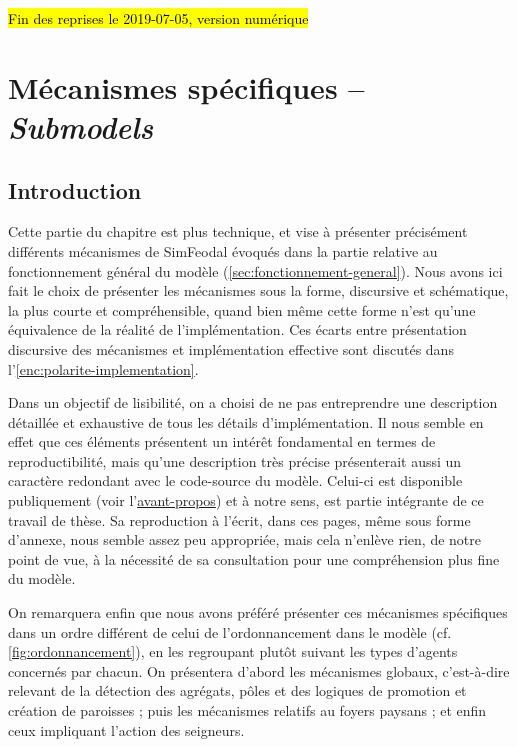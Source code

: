\begin{center}	
	\hl{Fin des reprises le 2019-07-05, version numérique}
\end{center}

\let\orisectionmark\sectionmark
\renewcommand\sectionmark[1]{}%
\section[Mécanismes spécifiques -- \textit{Submodels}]{Mécanismes spécifiques -- \large{\textit{Submodels}}\label{sec:meca-specifiques}}
\orisectionmark{Mécanismes spécifiques}
\let\sectionmark\orisectionmark


\subsection{Introduction}

Cette partie du chapitre est plus technique, et vise à présenter précisément différents mécanismes de SimFeodal évoqués dans la partie relative au fonctionnement général du modèle (\cref{sec:fonctionnement-general}).
Nous avons ici fait le choix de présenter les mécanismes sous la forme, discursive et schématique, la plus courte et compréhensible, quand bien même cette forme n'est qu'une \og équivalence\fg{} de la réalité de l'implémentation.
Ces écarts entre présentation discursive des mécanismes et implémentation effective sont discutés dans l'\cref{enc:polarite-implementation}.

Dans un objectif de lisibilité, on a choisi de ne pas entreprendre une description détaillée et exhaustive de tous les détails d'implémentation.
Il nous semble en effet que ces éléments présentent un intérêt fondamental en termes de reproductibilité, mais qu'une description très précise présenterait aussi un caractère redondant avec le code-source du modèle.
Celui-ci est disponible publiquement (voir l'\hyperlink{avant-propos}{avant-propos}) et à notre sens, est partie intégrante de ce travail de thèse.
Sa reproduction à l'écrit, dans ces pages, même sous forme d'annexe, nous semble assez peu appropriée, mais cela n'enlève rien, de notre point de vue, à la nécessité de sa consultation pour une compréhension plus fine du modèle.


On remarquera enfin que nous avons préféré présenter ces mécanismes spécifiques dans un ordre différent de celui de l'ordonnancement dans le modèle (cf. \cref{fig:ordonnancement}), en les regroupant plutôt suivant les types d'agents concernés par chacun.
On présentera d'abord les mécanismes \og globaux\fg{}, c'est-à-dire relevant de la détection des agrégats, pôles et des logiques de promotion et création de paroisses ; puis les mécanismes relatifs au foyers paysans ; et enfin ceux impliquant l'action des seigneurs.

